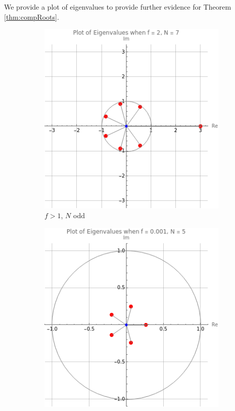 \documentclass[11pt,reqno]{amsart}
\numberwithin{equation}{section}
\theoremstyle{plain}
\begin{document}
We provide a plot of eigenvalues to provide further evidence for 
Theorem \ref{thm:compRoots}. 
\begin{figure}[htp]
    \centering
    \begin{subfigure}[b]{0.45\textwidth}
        \includegraphics[width=\textwidth]{f2N7.png}
        \caption{$f > 1$, $N$ odd}
        \label{fig:fig1}
    \end{subfigure}
    \hfill
    \begin{subfigure}[b]{0.45\textwidth}
        \includegraphics[width=\textwidth]{fsmN5.png}

\end{subfigure}
\end{figure}
\end{document}
